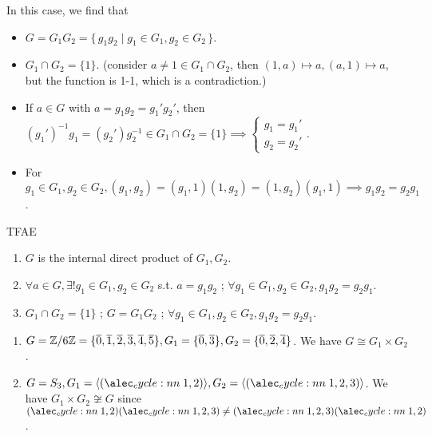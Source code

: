\begin{remark}
  In this case, we find that
  \begin{itemize}
    \item $G = G_1 G_2 = \{\, g_1 g_2 \mid g_1 \in G_1, g_2 \in G_2 \,\}$.
    \item $G_1 \cap G_2 = \{ 1 \}$. (consider $a \ne 1 \in G_1 \cap G_2$, then
      $(1, a) \mapsto a, (a, 1) \mapsto a$, but the function is 1-1, which
      is a contradiction.)
    \item If $a \in G$ with $a = g_1g_2 = g_1'g_2'$, then
      $(g_1')^{-1}g_1 = (g_2')g_2^{-1} \in G_1 \cap G_2 = \{ 1 \} \implies
      \begin{cases} g_1 = g_1' \\ g_2 = g_2'\end{cases}$.
    \item For $g_1 \in G_1, g_2 \in G_2, (g_1, g_2) = (g_1, 1)(1, g_2) =
      (1, g_2)(g_1, 1) \implies g_1g_2 = g_2g_1$.
  \end{itemize}
\end{remark}

\begin{exercise} TFAE
  \begin{enumerate}
    \item $G$ is the internal direct product of $G_1, G_2$.
    \item $\forall a \in G, \exists! g_1 \in G_1, g_2 \in G_2$ s.t.
      $a = g_1g_2$ ; $\forall g_1 \in G_1, g_2 \in G_2, g_1g_2 = g_2g_1$.
    \item $G_1 \cap G_2 = \{ 1 \}$ ; $G = G_1G_2$ ;
      $\forall g_1 \in G_1, g_2 \in G_2, g_1g_2 = g_2g_1$.
  \end{enumerate}
\end{exercise}

\begin{example} \mbox{}
  \begin{enumerate}
    \item $G = \mathbb{Z}/6\mathbb{Z} = \{ \overline{0}, \overline{1}, \overline{2}, \overline{3}, \overline{4}, \overline{5} \},
      G_1 = \{ \overline{0}, \overline{3} \}, G_2 = \{ \overline{0}, \overline{2}, \overline{4} \}$.
      We have $G \cong G_1 \times G_2$.
    \item $G = S_3, G_1 = \langle \cycle{1,2} \rangle, G_2 = \langle \cycle{1,2,3} \rangle$.
      We have $G_1 \times G_2 \not\cong G$ since $\cycle{1,2}\cycle{1,2,3} \ne
      \cycle{1,2,3}\cycle{1,2}$.
  \end{enumerate}
\end{example}


